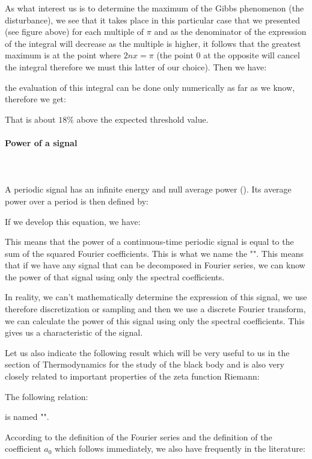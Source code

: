 	As what interest us is to determine the maximum of the Gibbs phenomenon (the disturbance), we see that it takes place in this particular case that we presented (see figure above) for each multiple of $\pi$ and as the denominator of the expression of the integral will decrease as the multiple is higher, it follows that the greatest maximum is at the point where $2nx=\pi$  (the point $0$ at the opposite will cancel the integral therefore we must this latter of our choice). Then we have:
	
	the evaluation of this integral can be done only numerically as far as we know, therefore we get:
	
	That is about $18\%$ above the expected threshold value.
	
	\paragraph{Power of a signal}\mbox{}\\\\
	A periodic signal has an infinite energy and null average power (). Its average power over a period is then defined by:
	
	If we develop this equation, we have:
	
	This means that the power of a continuous-time periodic signal is equal to the sum of the squared Fourier coefficients. This is what we name the "". This means that if we have any signal that can be decomposed in Fourier series, we can know the power of that signal using only the spectral coefficients.
	
	In reality, we can't mathematically determine the expression of this signal, we use therefore discretization or sampling and then we use a discrete Fourier transform, we can calculate the power of this signal using only the spectral coefficients. This gives us a characteristic of the signal.
	
	Let us also indicate the following result which will be very useful to us in the section of Thermodynamics for the study of the black body and is also very closely related to important properties of the zeta function Riemann:
	
	The following relation:
	
	is named "".
	
	According to the definition of the Fourier series and the definition of the coefficient $a_0$ which follows immediately, we also have frequently in the literature:
	
